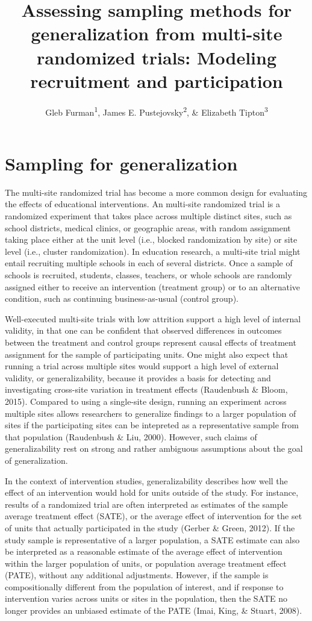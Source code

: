 \documentclass[
  english,
  man,floatsintext]{apa6}
\title{Assessing sampling methods for generalization from multi-site randomized trials: Modeling recruitment and participation}
\author{Gleb Furman\textsuperscript{1}, James E. Pustejovsky\textsuperscript{2}, \& Elizabeth Tipton\textsuperscript{3}}
\date{}
\affiliation{\vspace{0.5cm}\textsuperscript{1} University of Texas at Austin\\\textsuperscript{2} University of Wisconsin-Madison\\\textsuperscript{3} Northwestern University}
\begin{document}
\maketitle

\hypertarget{sampling-for-generalization}{%
\section{Sampling for generalization}\label{sampling-for-generalization}}

The multi-site randomized trial has become a more common design for evaluating the effects of educational interventions. An multi-site randomized trial is a randomized experiment that takes place across multiple distinct sites, such as school districts, medical clinics, or geographic areas, with random assignment taking place either at the unit level (i.e., blocked randomization by site) or site level (i.e., cluster randomization). In education research, a multi-site trial might entail recruiting multiple schools in each of several districts. Once a sample of schools is recruited, students, classes, teachers, or whole schools are randomly assigned either to receive an intervention (treatment group) or to an alternative condition, such as continuing business-as-usual (control group).

Well-executed multi-site trials with low attrition support a high level of internal validity, in that one can be confident that observed differences in outcomes between the treatment and control groups represent causal effects of treatment assignment for the sample of participating units. One might also expect that running a trial across multiple sites would support a high level of external validity, or generalizability, because it provides a basis for detecting and investigating cross-site variation in treatment effects (Raudenbush \& Bloom, 2015). Compared to using a single-site design, running an experiment across multiple sites allows researchers to generalize findings to a larger population of sites if the participating sites can be intepreted as a representative sample from that population (Raudenbush \& Liu, 2000). However, such claims of generalizability rest on strong and rather ambiguous assumptions about the goal of generalization.

In the context of intervention studies, generalizability describes how well the effect of an intervention would hold for units outside of the study. For instance, results of a randomized trial are often interpreted as estimates of the sample average treatment effect (SATE), or the average effect of intervention for the set of units that actually participated in the study (Gerber \& Green, 2012). If the study sample is representative of a larger population, a SATE estimate can also be interpreted as a reasonable estimate of the average effect of intervention within the larger population of units, or population average treatment effect (PATE), without any additional adjustments. However, if the sample is compositionally different from the population of interest, and if response to intervention varies across units or sites in the population, then the SATE no longer provides an unbiased estimate of the PATE (Imai, King, \& Stuart, 2008).
\end{document}
